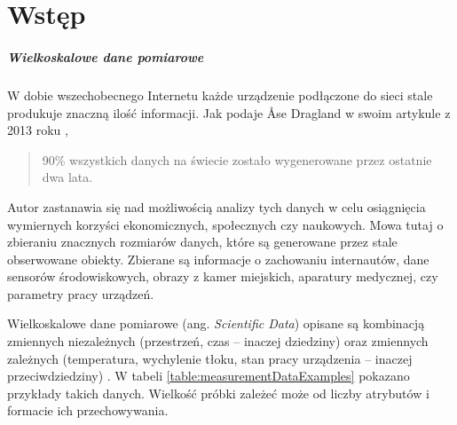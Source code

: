 \chapter{Wst\k{e}p}

\paragraph{Wielkoskalowe dane pomiarowe}

W dobie wszechobecnego Internetu każde urządzenie podłączone do sieci stale produkuje znaczną ilość informacji.
Jak podaje Åse Dragland w swoim artykule z 2013 roku \cite{dragland2013big},
\begin{quote}
	90\% wszystkich danych na świecie zostało wygenerowane przez ostatnie dwa lata.
\end{quote}
Autor zastanawia się nad możliwością analizy tych danych w celu osiągnięcia wymiernych korzyści ekonomicznych, społecznych czy naukowych.
Mowa tutaj o zbieraniu znacznych rozmiarów danych, które są generowane przez stale obserwowane obiekty.
Zbierane są informacje o zachowaniu internautów, dane sensorów środowiskowych, obrazy z kamer miejskich, aparatury medycznej, czy parametry pracy urządzeń.


Wielkoskalowe dane pomiarowe (ang. \textit{Scientific Data}) opisane są kombinacją zmiennych niezależnych (przestrzeń, czas -- inaczej dziedziny) oraz zmiennych zależnych (temperatura, wychylenie tłoku, stan pracy urządzenia -- inaczej przeciwdziedziny) \cite{Hauser12VisTutorial}.
W tabeli \ref{table:measurementDataExamples} pokazano przykłady takich danych.
Wielkość próbki zależeć może od liczby atrybutów i formacie ich przechowywania.

